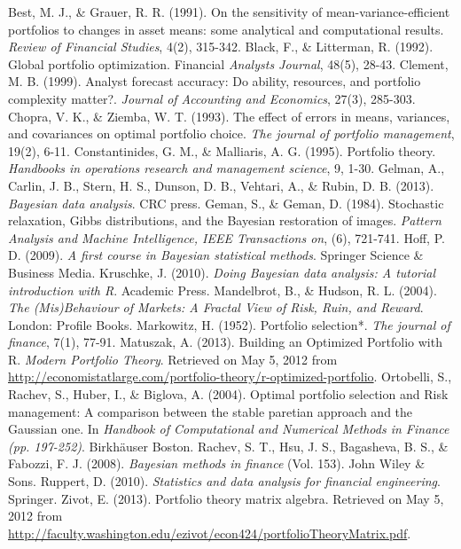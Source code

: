 \documentclass[a4paper]{article}\usepackage[]{graphicx}\usepackage[]{color}
\begin{document}
\begin{thebibliography}{99}
         Best, M. J., \& Grauer, R. R. (1991). On the sensitivity of mean-variance-efficient portfolios to changes in asset means: some analytical and computational results. \textit{Review of Financial Studies}, 4(2), 315-342.
         Black, F., \& Litterman, R. (1992). Global portfolio optimization. Financial \textit{Analysts Journal}, 48(5), 28-43.
         Clement, M. B. (1999). Analyst forecast accuracy: Do ability, resources, and portfolio complexity matter?.\textit{ Journal of Accounting and Economics}, 27(3), 285-303.
         Chopra, V. K., \& Ziemba, W. T. (1993). The effect of errors in means, variances, and covariances on optimal portfolio choice. \textit{The journal of portfolio management}, 19(2), 6-11.
         Constantinides, G. M., \& Malliaris, A. G. (1995). Portfolio theory. \emph{Handbooks in operations research and management science}, 9, 1-30.
         Gelman, A., Carlin, J. B., Stern, H. S., Dunson, D. B., Vehtari, A., \& Rubin, D. B. (2013). \textit{Bayesian data analysis}. CRC press.
         Geman, S., \& Geman, D. (1984). Stochastic relaxation, Gibbs distributions, and the Bayesian restoration of images.\textit{ Pattern Analysis and Machine Intelligence, IEEE Transactions on}, (6), 721-741.
         Hoff, P. D. (2009). \textit{A first course in Bayesian statistical methods}. Springer Science \& Business Media.
         Kruschke, J. (2010). \emph{Doing Bayesian data analysis: A tutorial introduction with R}. Academic Press.
         Mandelbrot, B., \& Hudson, R. L. (2004). \textit{The (Mis)Behaviour of Markets: A Fractal View of Risk, Ruin, and Reward}. London: Profile Books.
         Markowitz, H. (1952). Portfolio selection*. \textit{The journal of finance}, 7(1), 77-91. 
     Matuszak, A. (2013). Building an Optimized Portfolio with R. \textit{Modern Portfolio Theory}. Retrieved on May 5, 2012 from \url{http://economistatlarge.com/portfolio-theory/r-optimized-portfolio}. 
        Ortobelli, S., Rachev, S., Huber, I., \& Biglova, A. (2004). Optimal portfolio selection and Risk management: A comparison between the stable paretian approach and the Gaussian one. In \textit{Handbook of Computational and Numerical Methods in Finance (pp. 197-252)}. Birkhäuser Boston.
         Rachev, S. T., Hsu, J. S., Bagasheva, B. S., \& Fabozzi, F. J. (2008). \textit{Bayesian methods in finance} (Vol. 153). John Wiley \& Sons.
         Ruppert, D. (2010). \textit{Statistics and data analysis for financial engineering}. Springer.
         Zivot, E. (2013). Portfolio theory matrix algebra. Retrieved on May 5, 2012 from \url{http://faculty.washington.edu/ezivot/econ424/portfolioTheoryMatrix.pdf}.
\end{thebibliography}
\end{document}
